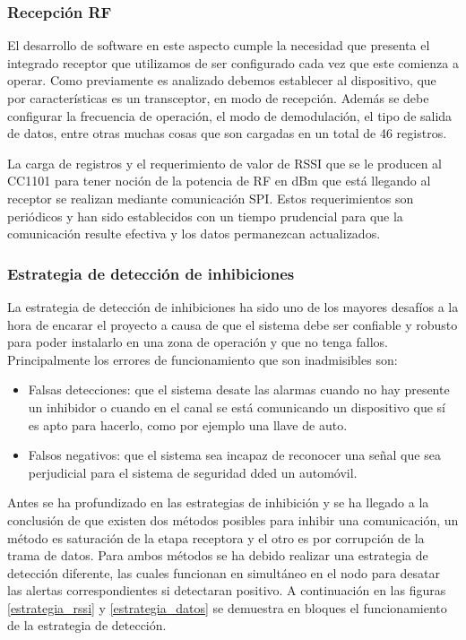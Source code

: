 \subsubsection{Recepción RF}

El desarrollo de software en este aspecto cumple la necesidad que presenta el integrado receptor que utilizamos de ser 
configurado cada vez que este comienza a operar. Como previamente es analizado debemos establecer al dispositivo, que por
características es un transceptor, en modo de recepción. Además se debe configurar la frecuencia de operación, el modo de 
demodulación, el tipo de salida de datos, entre otras muchas cosas que son cargadas en un total de 46 registros. \par 
La carga de registros y el requerimiento de valor de RSSI que se le producen al CC1101 para tener noción de la potencia 
de RF en dBm que está llegando al receptor se realizan mediante comunicación SPI. Estos requerimientos son periódicos y 
han sido establecidos con un tiempo prudencial para que la comunicación resulte efectiva y los datos permanezcan actualizados.

\subsubsection{Estrategia de detección de inhibiciones}

La estrategia de detección de inhibiciones ha sido uno de los mayores desafíos a la hora de encarar el proyecto a causa de que
el sistema debe ser confiable y robusto para poder instalarlo en una zona de operación y que no tenga fallos. Principalmente
los errores de funcionamiento que son inadmisibles son: 
\begin{itemize}
	\item Falsas detecciones: que el sistema desate las alarmas cuando no hay presente un inhibidor o cuando en el canal se está
	comunicando un dispositivo que sí es apto para hacerlo, como por ejemplo una llave de auto.
	\item Falsos negativos: que el sistema sea incapaz de reconocer una señal que sea perjudicial para el sistema de seguridad
	dded un automóvil.
\end{itemize} 

Antes se ha profundizado en las estrategias de inhibición y se ha llegado a la conclusión de que existen dos métodos posibles
para inhibir una comunicación, un método es saturación de la etapa receptora y el otro es por corrupción de la trama de datos.
Para ambos métodos se ha debido realizar una estrategia de detección diferente, las cuales funcionan en simultáneo en el nodo
para desatar las alertas correspondientes si detectaran positivo. A continuación en las figuras \ref{estrategia_rssi} 
y \ref{estrategia_datos} se demuestra en bloques el funcionamiento de la estrategia de detección.

